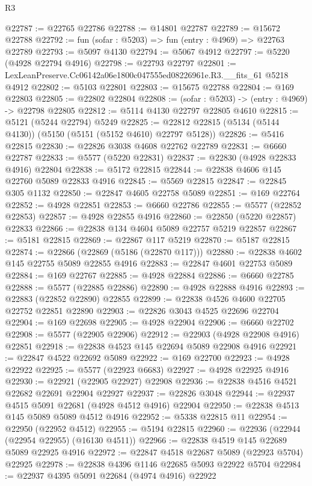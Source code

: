 \begin{lexlean}{R3}
\begin{coremodule}
@22787 := @22765 @22786
@22788 := @14801 @22787
@22789 := @15672 @22788
@22792 := fun (sofar : @5203) => fun (entry : @4969) => @22763 @22789
@22793 := @5097 @4130
@22794 := @5067 @4912
@22797 := @5220 (@4928 @22794 @4916)
@22798 := @22793 @22797
@22801 := LexLeanPreserve.Cc06142a06e1800c047555ed08226961e.R3.__fits_61 @5218 @4912
@22802 := @5103 @22801
@22803 := @15675 @22788
@22804 := @169 @22803
@22805 := @22802 @22804
@22808 := (sofar : @5203) -> (entry : @4969) -> @22798 @22805
@22812 := @5114 @4130 @22797 @22805 @4610
@22815 := @5121 (@5244 @22794) @5249
@22825 := @22812 @22815 (@5134 (@5144 @4130)) (@5150 (@5151 (@5152 @4610) @22797 @5128))
@22826 := @5416 @22815
@22830 := @22826 @3038 @4608 @22762 @22789
@22831 := @6660 @22787
@22833 := @5577 (@5220 @22831)
@22837 := @22830 (@4928 @22833 @4916) @22804
@22838 := @5172 @22815
@22844 := @22838 @4606 @145 @22760 @5089 @22833 @4916
@22845 := @5569 @22815
@22847 := @22845 @305 @1132
@22850 := @22847 @4605 @22758 @5089
@22851 := @169 @22764
@22852 := @4928 @22851
@22853 := @6660 @22786
@22855 := @5577 (@22852 @22853)
@22857 := @4928 @22855 @4916
@22860 := @22850 (@5220 @22857) @22833
@22866 := @22838 @134 @4604 @5089 @22757 @5219 @22857
@22867 := @5181 @22815
@22869 := @22867 @117 @5219
@22870 := @5187 @22815
@22874 := @22866 (@22869 (@5186 (@22870 @117)))
@22880 := @22838 @4602 @145 @22755 @5089 @22855 @4916
@22883 := @22847 @4601 @22753 @5089
@22884 := @169 @22767
@22885 := @4928 @22884
@22886 := @6660 @22785
@22888 := @5577 (@22885 @22886)
@22890 := @4928 @22888 @4916
@22893 := @22883 (@22852 @22890) @22855
@22899 := @22838 @4526 @4600 @22705 @22752 @22851 @22890
@22903 := @22826 @3043 @4525 @22696 @22704
@22904 := @169 @22698
@22905 := @4928 @22904
@22906 := @6660 @22702
@22908 := @5577 (@22905 @22906)
@22912 := @22903 (@4928 @22908 @4916) @22851
@22918 := @22838 @4523 @145 @22694 @5089 @22908 @4916
@22921 := @22847 @4522 @22692 @5089
@22922 := @169 @22700
@22923 := @4928 @22922
@22925 := @5577 (@22923 @6683)
@22927 := @4928 @22925 @4916
@22930 := @22921 (@22905 @22927) @22908
@22936 := @22838 @4516 @4521 @22682 @22691 @22904 @22927
@22937 := @22826 @3048
@22944 := @22937 @4515 @5091 @22681 (@4928 @4512 @4916) @22904
@22950 := @22838 @4513 @145 @5089 @5089 @4512 @4916
@22952 := @5338 @22815 @11
@22954 := @22950 (@22952 @4512)
@22955 := @5194 @22815
@22960 := @22936 (@22944 (@22954 @22955) (@16130 @4511))
@22966 := @22838 @4519 @145 @22689 @5089 @22925 @4916
@22972 := @22847 @4518 @22687 @5089 (@22923 @5704) @22925
@22978 := @22838 @4396 @1146 @22685 @5093 @22922 @5704
@22984 := @22937 @4395 @5091 @22684 (@4974 @4916) @22922

\end{coremodule}
\end{lexlean}
